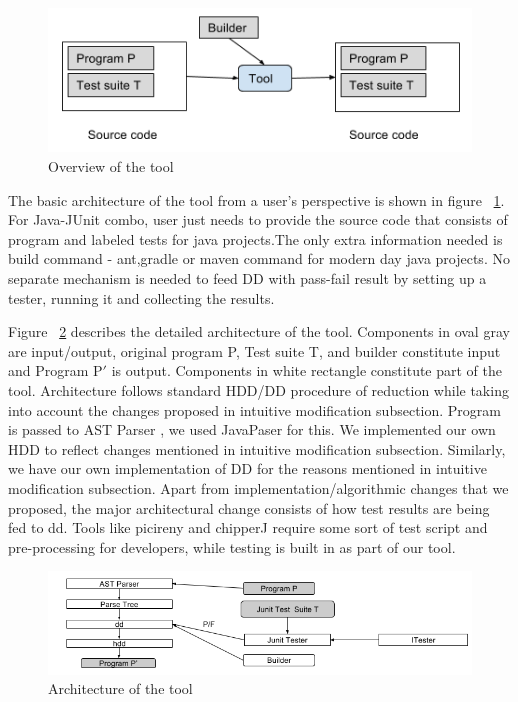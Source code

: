 \begin{figure}
  \centering
  \includegraphics[width=1.0 \columnwidth]{basic_tool_architecture.png}
  \caption{Overview of the tool}
  \captionsetup{justification=centering}
  \label{fig:fig1}
\end{figure}



The basic architecture of the tool from a user's perspective is shown in figure ~\ref{fig:fig1}. For Java-JUnit combo, user just needs to provide the source code that consists of program and labeled tests for java projects.The only extra information needed is build command - ant,gradle or maven command for modern day java projects. No separate mechanism is needed to feed DD with pass-fail result by setting up a tester, running it and collecting the results. 

Figure ~\ref{fig:figDetailedToolArch} describes the detailed architecture of the tool. Components in oval gray are input/output, original program P, Test suite T, and builder constitute input and Program P$'$ is output. Components in white rectangle constitute part of the tool. Architecture follows standard HDD/DD procedure of reduction while taking into account the changes proposed in intuitive modification subsection. Program is passed to AST Parser \cite{javaparser}, we used JavaPaser for this. We implemented our own HDD to reflect changes mentioned in intuitive modification subsection. Similarly, we have our own implementation of DD for the reasons mentioned in intuitive modification subsection. Apart from implementation/algorithmic changes that we proposed, the major architectural change consists of how test results are being fed to dd. Tools like picireny and chipperJ require some sort of test script and pre-processing for developers, while testing is built in as part of our tool. 			

\begin{figure}
  \centering
  \includegraphics[width=1.8 \columnwidth]{detailed_tool_architecture.png}
  \caption{Architecture of the tool}
  \captionsetup{justification=centering}
  \label{fig:figDetailedToolArch}
\end{figure}